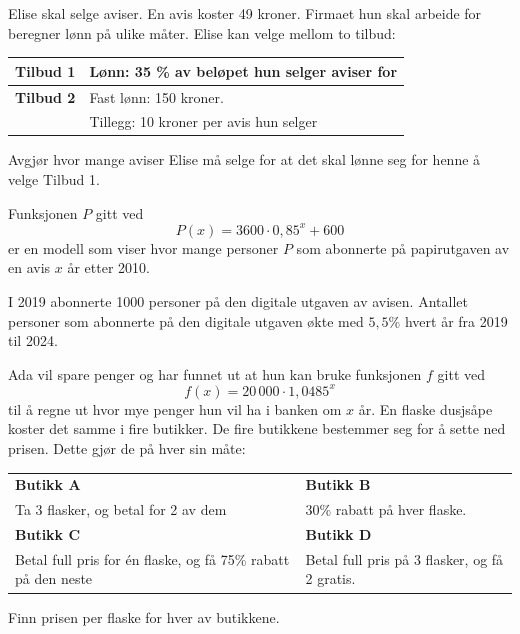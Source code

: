 \newpage
{}
Elise skal selge aviser. En avis koster 49 kroner. Firmaet hun skal arbeide for beregner lønn på ulike måter. Elise kan velge mellom to tilbud:
\begin{center}
	\begin{tabular}{l | p{7cm}}
		\textbf{Tilbud 1} &
		Lønn: 35 \% av beløpet hun selger aviser for \\ \hline
		\textbf{Tilbud 2} &
		Fast lønn: 150 kroner. \\
		& Tillegg: 10 kroner per avis hun selger
	\end{tabular}
\end{center}

Avgjør hvor mange aviser Elise må selge for at det skal lønne seg for henne å velge Tilbud 1.

Funksjonen $P$ gitt ved
\[
P(x) = 3600 \cdot 0,85^x + 600
\]
er en modell som viser hvor mange personer $P$ som abonnerte på papirutgaven
av en avis $x$ år etter 2010.


I 2019 abonnerte 1000 personer på den digitale utgaven av avisen.
Antallet personer som abonnerte på den digitale utgaven økte med
$5{,}5\%$ hvert år fra 2019 til 2024.


\newpage
{}
Ada vil spare penger og har funnet ut at hun kan bruke funksjonen $f$ gitt ved
\[
f(x) = 20\,000 \cdot 1,0485^{x}
\]
til å regne ut hvor mye penger hun vil ha i banken om $x$ år.
En flaske dusjsåpe koster det samme i fire butikker.
De fire butikkene bestemmer seg for å sette ned prisen.
Dette gjør de på hver sin måte:
\begin{center}
	\small
	\begin{tabular}{|p{5cm}|p{5cm}|}
		\hline
		\textbf{Butikk A} & \textbf{Butikk B} \\
		Ta 3 flasker, og 
		betal for 2 av dem	& 30\% rabatt på hver flaske. \\\hline
		\textbf{Butikk C} & \textbf{Butikk D} \\
		Betal full pris for én flaske, og få 75\% rabatt på den neste & Betal full pris på 3 flasker, og få 2 gratis. \\
		\hline
	\end{tabular}
\end{center}
Finn prisen per flaske for hver av butikkene.

